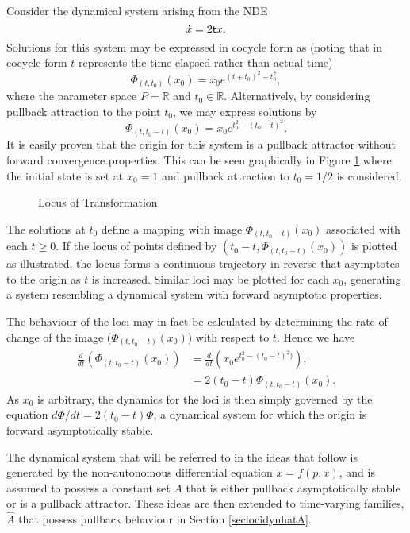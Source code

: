 \begin{eg}
Consider the dynamical system arising from the NDE
\[ \dot{x} = 2 \mathsf{\mathsf{t}} x. \]
Solutions for this system may be expressed in cocycle form as (noting that
in cocycle form $t$ represents the time elapsed rather than actual time)
\[ \Phi_{(t,t_0)}(x_0) = x_0 e^{(t+ t_0)^2 - t_0^2}, \]
where the parameter space $P = \mathbb{R}$ and $t_0 \in \mathbb{R}$.
Alternatively, by considering pullback attraction to the point $t_0$, we may
express solutions by
\[ \Phi_{(t, t_0-t)}(x_0) = x_0 e^{t_0^2 - (t_0-t)^2}. \]
It is easily proven that the origin for this system is a pullback
attractor without forward convergence properties. This can be seen
graphically in Figure \ref{loci0} where the initial state is set
at $x_0 = 1$ and pullback attraction to $t_0 = 1/2$ is considered.

\begin{figure}[htb]
\begin{center}
 \caption{Locus of Transformation}
\protect\label{loci0}
\end{center}
\end{figure}

The solutions at $t_0$ define a mapping with image $\Phi_{(t,t_0-t)}(x_0)$
associated with each $t \geq 0$. If the locus of points defined by
$(t_0 - t, \Phi_{(t,t_0-t)}(x_0))$ is plotted as illustrated,
the locus forms a continuous trajectory in reverse that asymptotes to the
origin as $t$ is increased. Similar loci may be plotted for each $x_0$,
generating a system resembling a dynamical system with forward asymptotic
properties.

The behaviour of the loci may in fact be calculated by determining the rate of
change of the image ($\Phi_{(t,t_0-t)}(x_0)$) with respect to $t$. Hence we
have
\begin{align*}
\frac{d}{dt}\left(\Phi_{(t,t_0-t)}(x_0)\right) &= \frac{d}{dt} \left( x_0
                e^{t_0^2 - (t_0-t)^2)} \right), \\
&= 2(t_0 - t) \Phi_{(t,t_0-t)}(x_0).
\end{align*}
As $x_0$ is arbitrary, the dynamics for the loci is then simply governed by the
equation $d\Phi / dt = 2(t_0 - t) \Phi$, a dynamical system for which the
origin is forward asymptotically stable.
\end{eg}

The dynamical system that will be referred to in the ideas that
follow is generated by the non-autonomous differential equation
$\dot{x} = f(p, x)$, and is assumed to possess a constant set $A$ that is either
pullback asymptotically stable or is a pullback attractor.  These ideas are then
extended to time-varying families, $\hat{A}$ that possess pullback
behaviour in Section \ref{seclocidynhatA}.

